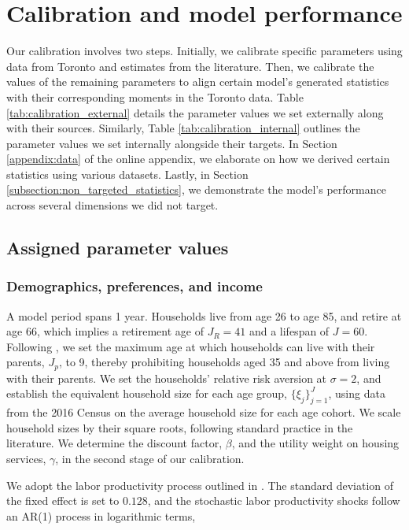 \documentclass[parskip=full]{article}
\begin{document}
\section{Calibration and model performance}\label{sec:calibration}

Our calibration involves two steps. Initially, we calibrate specific parameters using data from Toronto and estimates from the literature. Then, we calibrate the values of the remaining parameters to align certain model's generated statistics with their corresponding moments in the Toronto data. Table \ref{tab:calibration_external} details the parameter values we set externally along with their sources. Similarly, Table \ref{tab:calibration_internal} outlines the parameter values we set internally alongside their targets. In Section \ref{appendix:data} of the online appendix, we elaborate on how we derived certain statistics using various datasets. Lastly, in Section \ref{subsection:non_targeted_statistics}, we demonstrate the model's performance across several dimensions we did not target.

\subsection{Assigned parameter values}

\subsubsection{Demographics, preferences, and income}
A model period spans 1 year. Households live from age 26 to age 85, and retire at age 66, which implies a retirement age of $J_{R}=41$ and a lifespan of $J=60$. Following \citet{rs-2023}, we set the maximum age at which households can live with their parents, $J_{p}$, to 9, thereby prohibiting households aged 35 and above from living with their parents. We set the households' relative risk aversion at $\sigma=2$, and establish the equivalent household size for each age group, $\{\xi_{j}\}_{j=1}^{J}$, using data from the 2016 Census on the average household size for each age cohort. We scale household sizes by their square roots, following standard practice in the literature. We determine the discount factor, $\beta$, and the utility weight on housing services, $\gamma$, in the second stage of our calibration.

We adopt the labor productivity process outlined in \citet{gkkoc}. The standard deviation of the fixed effect is set to $0.128$, and the stochastic labor productivity shocks follow an AR(1) process in logarithmic terms,
\end{document}
